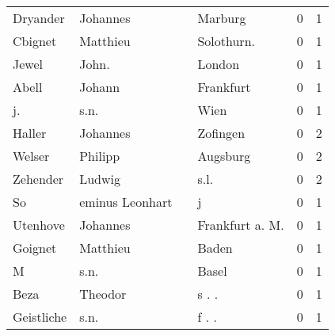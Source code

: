 \begin{center}
\begin{tiny}
\begin{longtabu}{llllrr}
                 Dryander &                           Johannes &             &                                     Marburg &          0 &         1 \\
                  Cbignet &                           Matthieu &             &                                 Solothurn.  &          0 &         1 \\
                    Jewel &                              John. &             &                                      London &          0 &         1 \\
                    Abell &                             Johann &             &                                   Frankfurt &          0 &         1 \\
                       j. &                               s.n. &             &                                        Wien &          0 &         1 \\
                   Haller &                           Johannes &             &                                    Zofingen &          0 &         2 \\
                   Welser &                            Philipp &             &                                    Augsburg &          0 &         2 \\
                 Zehender &                             Ludwig &             &                                        s.l. &          0 &         2 \\
                       So &                    eminus Leonhart &             &                                           j &          0 &         1 \\
                 Utenhove &                           Johannes &             &                            Frankfurt a. M.  &          0 &         1 \\
                  Goignet &                           Matthieu &             &                                       Baden &          0 &         1 \\
                        M &                               s.n. &             &                                       Basel &          0 &         1 \\
                     Beza &                            Theodor &             &                                      s . .  &          0 &         1 \\
               Geistliche &                               s.n. &             &                                      f . .  &          0 &         1 \\

\end{longtabu}
\end{tiny}
\end{center}
